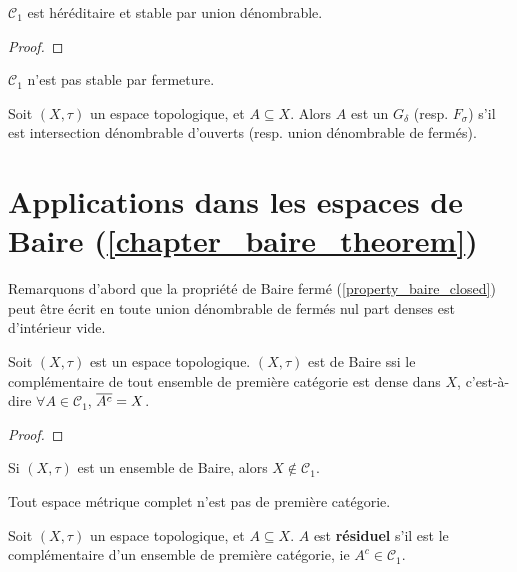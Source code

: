 \begin{proposition}
	$\mathcal{C}_{1}$ est héréditaire et stable par union
	dénombrable.
\end{proposition}

\begin{proof}
	
\end{proof}

\begin{remarque}
	$\mathcal{C}_{1}$ n'est pas stable par fermeture.
\end{remarque}

\begin{definition}
	Soit $(X, \tau)$ un espace topologique, et $A \subseteq X$.
	Alors $A$ est un $G_{\delta}$ (resp. $F_{\sigma}$) s'il est intersection
	dénombrable d'ouverts (resp. union dénombrable de fermés).
\end{definition}

\section{Applications dans les espaces de Baire (\ref{chapter_baire_theorem})}

Remarquons d'abord que la propriété de Baire fermé
(\ref{property_baire_closed}) peut être écrit en toute union dénombrable
de fermés nul part denses est d'intérieur vide.

\begin{proposition}
	Soit $(X, \tau)$ est un espace topologique.
	$(X, \tau)$ est de Baire ssi le complémentaire de tout ensemble de première
	catégorie est dense dans $X$, c'est-à-dire $\forall A \in \mathcal{C}_{1}$,
	$\overline{A^{c}} = X$.
\end{proposition}

\begin{proof}
	
\end{proof}

\begin{corollary}
	Si $(X, \tau)$ est un ensemble de Baire, alors $X \notin \mathcal{C}_{1}$.
\end{corollary}

\begin{corollary}
	Tout espace métrique complet n'est pas de première catégorie.
\end{corollary}

\begin{definition}
	Soit $(X, \tau)$ un espace topologique, et $A \subseteq X$.
	$A$ est \textbf{résiduel} s'il est le complémentaire d'un ensemble de
	première catégorie, ie $A^{c} \in \mathcal{C}_{1}$.
\end{definition}

